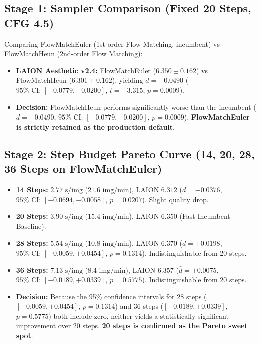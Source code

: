 \documentclass[10pt,twocolumn,letterpaper]{article}
\begin{document}
\subsection{Stage 1: Sampler Comparison (Fixed 20 Steps, CFG 4.5)}
Comparing FlowMatchEuler (1st-order Flow Matching, incumbent) vs FlowMatchHeun (2nd-order Flow Matching):
\begin{itemize}
    \item \textbf{LAION Aesthetic v2.4:} FlowMatchEuler ($6.350 \pm 0.162$) vs FlowMatchHeun ($6.301 \pm 0.162$), yielding $\bar{d} = -0.0490$ ($95\%\text{ CI: } [-0.0779, -0.0200]$, $t = -3.315$, $p = 0.0009$).
    \item \textbf{Decision:} FlowMatchHeun performs significantly worse than the incumbent ($\bar{d} = -0.0490$, $95\%\text{ CI: } [-0.0779, -0.0200]$, $p = 0.0009$). \textbf{FlowMatchEuler is strictly retained as the production default}.
\end{itemize}

\subsection{Stage 2: Step Budget Pareto Curve (14, 20, 28, 36 Steps on FlowMatchEuler)}
\begin{itemize}
    \item \textbf{14 Steps:} $2.77\text{ s/img}$ ($21.6\text{ img/min}$), LAION $6.312$ ($\bar{d} = -0.0376$, $95\%\text{ CI: } [-0.0694, -0.0058]$, $p = 0.0207$). Slight quality drop.
    \item \textbf{20 Steps:} $3.90\text{ s/img}$ ($15.4\text{ img/min}$), LAION $6.350$ (Fast Incumbent Baseline).
    \item \textbf{28 Steps:} $5.54\text{ s/img}$ ($10.8\text{ img/min}$), LAION $6.370$ ($\bar{d} = +0.0198$, $95\%\text{ CI: } [-0.0059, +0.0454]$, $p = 0.1314$). Indistinguishable from 20 steps.
    \item \textbf{36 Steps:} $7.13\text{ s/img}$ ($8.4\text{ img/min}$), LAION $6.357$ ($\bar{d} = +0.0075$, $95\%\text{ CI: } [-0.0189, +0.0339]$, $p = 0.5775$). Indistinguishable from 20 steps.
    \item \textbf{Decision:} Because the 95\% confidence intervals for 28 steps ($[-0.0059, +0.0454]$, $p = 0.1314$) and 36 steps ($[-0.0189, +0.0339]$, $p = 0.5775$) both include zero, neither yields a statistically significant improvement over 20 steps. \textbf{20 steps is confirmed as the Pareto sweet spot}.
\end{itemize}
\end{document}
